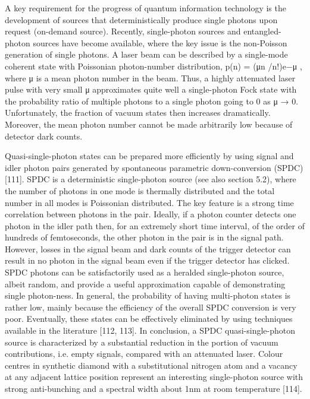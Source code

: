 			A key requirement for the progress of quantum information technology is the development of sources that deterministically produce single photons upon request (on-demand source). Recently, single-photon sources and entangled-photon sources have become available, where the key issue is the non-Poisson generation of single photons.
			A laser beam can be described by a single-mode coherent state with Poissonian photon-number distribution, p(n) = (μn /n!)e−μ , where μ is a mean photon number in the beam. Thus, a highly attenuated laser pulse with very small μ approximates quite well a single-photon Fock state with the probability ratio of multiple photons to a single photon going to 0 as μ → 0. Unfortunately, the fraction of vacuum states then increases dramatically. Moreover, the mean photon number cannot be made arbitrarily low because of detector dark counts.

			Quasi-single-photon states can be prepared more efficiently by using signal and idler photon pairs generated by spontaneous parametric down-conversion (SPDC) [111]. SPDC is a deterministic single-photon source (see also section 5.2), where the number of photons in one mode is thermally distributed and the total number in all modes is Poissonian distributed. The key feature is a strong time correlation between photons in the pair. Ideally, if a photon counter detects one photon in the idler path then, for an extremely short time interval, of the order of hundreds of femtoseconds, the other photon in the pair is in the signal path. However, losses in the signal beam and dark counts of the trigger detector can result in no photon in the signal beam even if the trigger detector has clicked. SPDC photons can be satisfactorily used as a heralded single-photon source, albeit random, and provide a useful approximation capable of demonstrating single photon-ness. In general, the probability of having multi-photon states is rather low, mainly because the efficiency of the overall SPDC conversion is very poor. Eventually, these states can be effectively eliminated by using techniques available in the literature [112, 113]. In conclusion, a SPDC quasi-single-photon source is characterized by a substantial reduction in the portion of vacuum contributions, i.e. empty signals, compared with an attenuated laser.
			Colour centres in synthetic diamond with a substitutional nitrogen atom and a vacancy at any adjacent lattice position represent an interesting single-photon source with strong anti-bunching and a spectral width about 1nm at room temperature [114].

